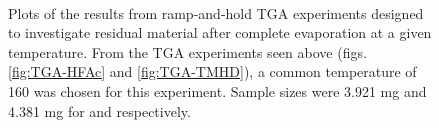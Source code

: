 \begin{figure}[htbp]
   \centering
    \\
   \caption[Constant Temperature TGA Experiments]%
   		{Plots of the results from ramp-and-hold TGA experiments designed to investigate residual material %
		after complete evaporation at a given temperature. From the TGA experiments seen above (figs.~%
		\vref{fig:TGA-HFAc} and \vref{fig:TGA-TMHD}), a common temperature of 160\degC{} was chosen %
		for this experiment. Sample sizes were 3.921 mg and 4.381 mg for \HFAc{} and \TMHD{} respectively.}
   \label{fig:TGA-Hold}
\end{figure}

